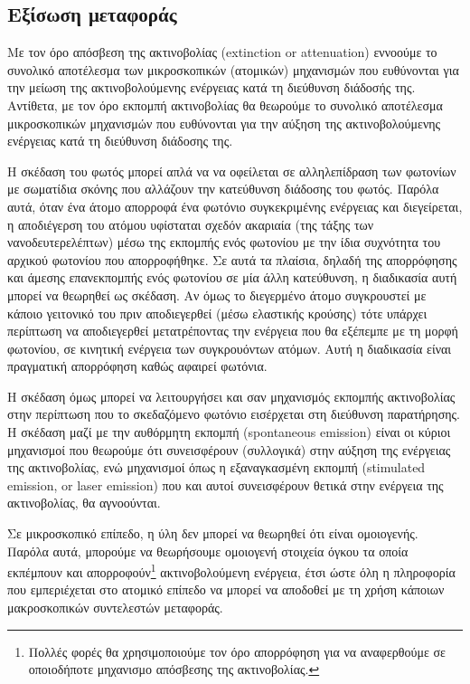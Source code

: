 \subsection{Εξίσωση μεταφοράς}
Με τον όρο απόσβεση της ακτινοβολίας (extinction or attenuation) εννοούμε το συνολικό αποτέλεσμα των μικροσκοπικών (ατομικών) μηχανισμών που ευθύνονται για την μείωση της ακτινοβολούμενης ενέργειας κατά τη διεύθυνση διάδοσής της.
Αντίθετα, με τον όρο εκπομπή ακτινοβολίας θα θεωρούμε το συνολικό αποτέλεσμα μικροσκοπικών μηχανισμών που ευθύνονται για την αύξηση της ακτινοβολούμενης ενέργειας κατά τη διεύθυνση διάδοσης της.

Η σκέδαση του φωτός μπορεί απλά να να οφείλεται σε αλληλεπίδραση των φωτονίων με σωματίδια σκόνης που αλλάζουν την κατεύθυνση διάδοσης του φωτός. Παρόλα αυτά, όταν ένα άτομο απορροφά ένα φωτόνιο συγκεκριμένης ενέργειας και διεγείρεται, η αποδιέγερση του ατόμου υφίσταται σχεδόν ακαριαία (της τάξης των νανοδευτερελέπτων) μέσω της εκπομπής ενός φωτονίου με την ίδια συχνότητα του αρχικού φωτονίου που απορροφήθηκε. Σε αυτά τα πλαίσια, δηλαδή της απορρόφησης και άμεσης επανεκπομπής ενός φωτονίου σε μία άλλη κατεύθυνση, η διαδικασία αυτή μπορεί να θεωρηθεί ως σκέδαση. Αν όμως το διεγερμένο άτομο συγκρουστεί με κάποιο γειτονικό του πριν αποδιεγερθεί (μέσω ελαστικής κρούσης) τότε υπάρχει περίπτωση να αποδιεγερθεί μετατρέποντας την ενέργεια που θα εξέπεμπε με τη μορφή φωτονίου, σε κινητική ενέργεια των συγκρουόντων ατόμων. Αυτή η διαδικασία είναι πραγματική απορρόφηση καθώς αφαιρεί φωτόνια.

Η σκέδαση όμως μπορεί να λειτουργήσει και σαν μηχανισμός εκπομπής ακτινοβολίας στην περίπτωση που το σκεδαζόμενο φωτόνιο εισέρχεται στη διεύθυνση παρατήρησης. Η σκέδαση μαζί με την αυθόρμητη εκπομπή (spontaneous emission) είναι οι κύριοι μηχανισμοί που θεωρούμε ότι συνεισφέρουν (συλλογικά) στην αύξηση της ενέργειας της ακτινοβολίας, ενώ μηχανισμοί όπως η εξαναγκασμένη εκπομπή (stimulated emission, or laser emission) που και αυτοί συνεισφέρουν θετικά στην ενέργεια της ακτινοβολίας, θα αγνοούνται.

Σε μικροσκοπικό επίπεδο, η ύλη δεν μπορεί να θεωρηθεί ότι είναι ομοιογενής. Παρόλα αυτά, μπορούμε να θεωρήσουμε ομοιογενή στοιχεία όγκου τα οποία εκπέμπουν και απορροφούν\footnote{Πολλές φορές θα χρησιμοποιούμε τον όρο απορρόφηση για να αναφερθούμε σε οποιοδήποτε μηχανισμο απόσβεσης της ακτινοβολίας.} ακτινοβολούμενη ενέργεια, έτσι ώστε όλη η πληροφορία που εμπεριέχεται στο ατομικό επίπεδο να μπορεί να αποδοθεί με τη χρήση κάποιων μακροσκοπικών συντελεστών μεταφοράς.


